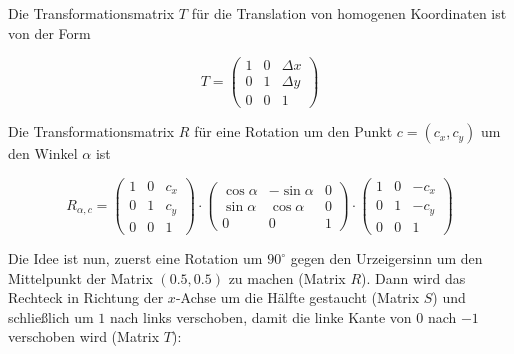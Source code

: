 \documentclass[a4paper]{scrartcl}
\begin{document}
Die Transformationsmatrix $T$ für die Translation von homogenen Koordinaten ist von der Form

\[T = \begin{pmatrix}1 & 0 & \Delta x\\0 & 1 & \Delta y\\0 & 0 & 1\end{pmatrix}\]

Die Transformationsmatrix $R$ für eine Rotation um den Punkt $c = (c_x, c_y)$ um den Winkel $\alpha$ ist

\[R_{\alpha, c} =
  \begin{pmatrix}          1 &            0 & c_x\\          0 &           1 & c_y\\0 & 0 & 1\end{pmatrix} \cdot
  \begin{pmatrix}\cos \alpha & -\sin \alpha &   0\\\sin \alpha & \cos \alpha &   0\\0 & 0 & 1\end{pmatrix} \cdot
  \begin{pmatrix}          1 &            0 &-c_x\\          0 &           1 &-c_y\\0 & 0 & 1\end{pmatrix}\]

Die Idee ist nun, zuerst eine Rotation um $90^\circ$ gegen den Urzeigersinn
um den Mittelpunkt der Matrix $(0.5, 0.5)$ zu machen (Matrix $R$). Dann wird das Rechteck in Richtung der $x$-Achse um
die Hälfte gestaucht (Matrix $S$) und schließlich um $1$ nach links verschoben, damit die linke Kante von $0$ nach $-1$ verschoben wird (Matrix $T$):
\end{document}
